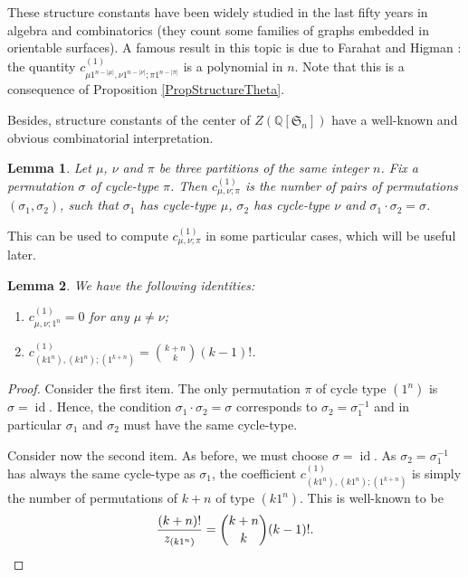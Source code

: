 \documentclass[11pt]{amsart}
\theoremstyle{plain}
\newtheorem{lemma}{Lemma}[section]
\theoremstyle{remark}
\newcommand{\Sym}[1]{\mathfrak{S}_{#1}}
\newcommand{\QQ}{\mathbb{Q}}
\DeclareMathOperator{\id}{id}
\begin{document}
These structure constants have been widely studied in the last fifty years in algebra
and combinatorics (they count some families of graphs embedded in orientable surfaces).
A famous result in this topic is due to Farahat and Higman 
\cite[Theorem 2.2]{FarahatHigmanCentreQSn}:
the quantity $c^{(1)}_{\mu 1^{n-|\mu|},\nu 1^{n-|\nu|};\pi 1^{n-|\pi|}}$ is a polynomial
in $n$.
Note that this is a consequence of Proposition \ref{PropStructureTheta}.\bigskip

Besides, structure constants of the center of $Z(\QQ[\Sym{n}])$
have a well-known and obvious combinatorial interpretation.

\begin{lemma}
    Let $\mu$, $\nu$ and $\pi$ be three partitions of the same integer $n$. 
    Fix a permutation $\sigma$ of cycle-type $\pi$.
    Then $c^{(1)}_{\mu,\nu;\pi}$ is the number of pairs of permutations
    $(\sigma_1,\sigma_2)$, such that $\sigma_1$ has cycle-type $\mu$,
    $\sigma_2$ has cycle-type $\nu$ and $\sigma_1 \cdot \sigma_2=\sigma$.
    \label{lem:Interpretation_StructureConstants_A1}
\end{lemma}

This can be used to compute $c^{(1)}_{\mu,\nu;\pi}$ in some particular cases,
which will be useful later.

\begin{lemma}
\label{lem:SC1}
We have the following identities:
\begin{enumerate}
\item
\label{eq:SC1-1} 
$c^{(1)}_{\mu, \nu; 1^n} = 0$ for any $\mu \neq \nu$;
\item
\label{eq:SC1-2}
$c^{(1)}_{(k 1^n),(k 1^n);(1^{k+n})} = \binom{k+n}{k} (k-1)!$.
\end{enumerate}
\end{lemma}

\begin{proof}
    Consider the first item.
    The only permutation $\pi$ of cycle type $(1^n)$ is $\sigma=\id$.
    Hence, the condition $\sigma_1 \cdot \sigma_2=\sigma$ corresponds
    to $\sigma_2=\sigma_1^{-1}$ and in particular $\sigma_1$ and 
    $\sigma_2$ must have the same cycle-type.

    Consider now the second item.
    As before, we must choose $\sigma=\id$.
    As $\sigma_2=\sigma_1^{-1}$ has always the same cycle-type as $\sigma_1$,
    the coefficient $c^{(1)}_{(k 1^n),(k 1^n);(1^{k+n})}$ is simply the number
    of permutations of $k+n$ of type $(k 1^n)$.
    This is well-known \cite[equation (1.2)]{SaganSymmetric} to be
    \[\frac{(k+n)!}{z_{(k 1^n)}}=\binom{k+n}{k} (k-1)!. \qedhere\]
\end{proof}
\end{document}
